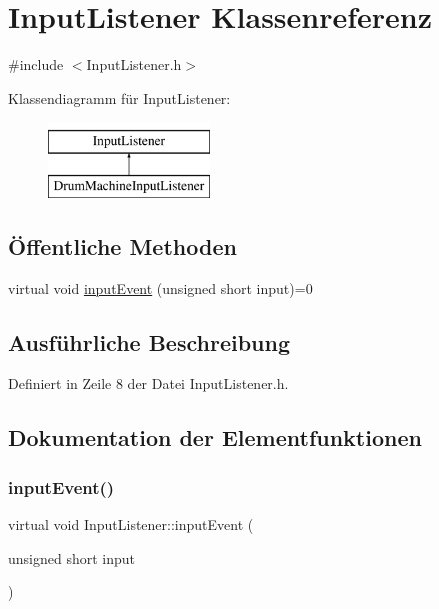 \hypertarget{class_input_listener}{}\section{Input\+Listener Klassenreferenz}
\label{class_input_listener}


{\ttfamily \#include $<$Input\+Listener.\+h$>$}

Klassendiagramm für Input\+Listener\+:\begin{figure}[H]
\begin{center}
\leavevmode
\includegraphics[height=2.000000cm]{class_input_listener}
\end{center}
\end{figure}
\subsection*{Öffentliche Methoden}
\begin{DoxyCompactItemize}
\item 
virtual void \hyperlink{class_input_listener_a1a3d74f2ffc108c773511ea4be250f7d}{input\+Event} (unsigned short input)=0
\end{DoxyCompactItemize}


\subsection{Ausführliche Beschreibung}


Definiert in Zeile 8 der Datei Input\+Listener.\+h.



\subsection{Dokumentation der Elementfunktionen}
\mbox{\label{class_input_listener_a1a3d74f2ffc108c773511ea4be250f7d}} 
\subsubsection{\texorpdfstring{input\+Event()}{inputEvent()}}
{\footnotesize\ttfamily virtual void Input\+Listener\+::input\+Event (\begin{DoxyParamCaption}\item[{unsigned short}]{input }\end{DoxyParamCaption})\hspace{0.3cm}{\ttfamily [pure virtual]}}



